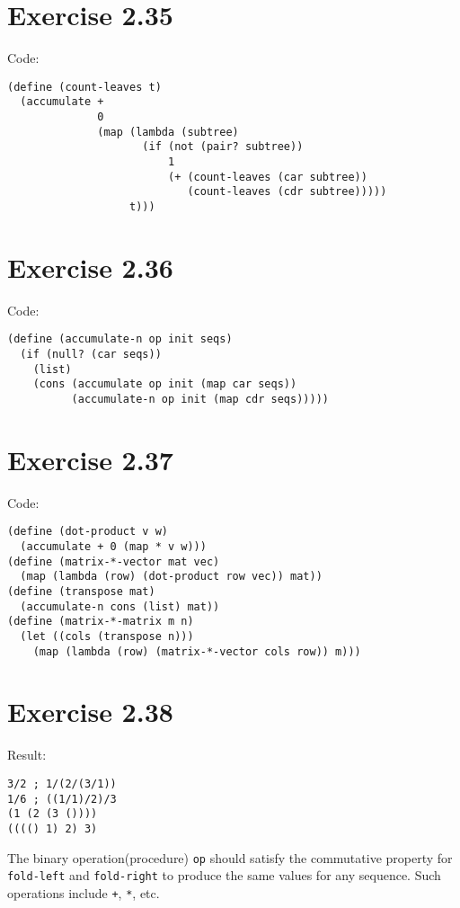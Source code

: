 \documentclass[../main.tex]{subfiles}
\begin{document}
\section{Exercise 2.35}

Code:

\begin{lstlisting}
(define (count-leaves t)
  (accumulate +
              0
              (map (lambda (subtree)
                     (if (not (pair? subtree))
                         1
                         (+ (count-leaves (car subtree))
                            (count-leaves (cdr subtree)))))
                   t)))
\end{lstlisting}

\section{Exercise 2.36}

Code:

\begin{lstlisting}
(define (accumulate-n op init seqs)
  (if (null? (car seqs))
    (list)
    (cons (accumulate op init (map car seqs))
          (accumulate-n op init (map cdr seqs)))))
\end{lstlisting}

\section{Exercise 2.37}

Code:

\begin{lstlisting}
(define (dot-product v w)
  (accumulate + 0 (map * v w)))
(define (matrix-*-vector mat vec)
  (map (lambda (row) (dot-product row vec)) mat))
(define (transpose mat)
  (accumulate-n cons (list) mat))
(define (matrix-*-matrix m n)
  (let ((cols (transpose n)))
    (map (lambda (row) (matrix-*-vector cols row)) m)))
\end{lstlisting}

\section{Exercise 2.38}

Result:

\begin{lstlisting}
3/2 ; 1/(2/(3/1))
1/6 ; ((1/1)/2)/3
(1 (2 (3 ())))
(((() 1) 2) 3)
\end{lstlisting}

The binary operation(procedure) \lstinline{op}
 should satisfy the commutative property for
 \lstinline{fold-left} and \lstinline{fold-right}
 to produce the same values for any sequence. Such
 operations include \lstinline{+}, \lstinline{*},
 etc.
\end{document}
